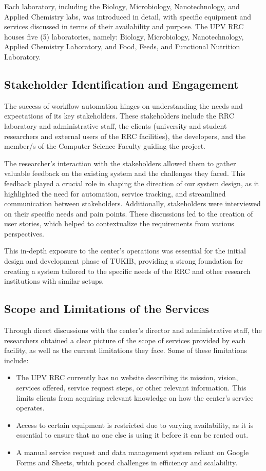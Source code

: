 Each laboratory, including the Biology, Microbiology, Nanotechnology, and Applied Chemistry labs, was introduced in detail, with specific equipment and services discussed in terms of their availability and purpose. The UPV RRC houses five (5) laboratories, namely: Biology, Microbiology, Nanotechnology, Applied Chemistry Laboratory, and Food, Feeds, and Functional Nutrition Laboratory.

\subsection{Stakeholder Identification and Engagement}
The success of workflow automation hinges on understanding the needs and expectations of its key stakeholders. These stakeholders include the RRC laboratory and administrative staff, the clients (university and student researchers and external users of the RRC facilities), the developers, and the member/s of the Computer Science Faculty guiding the project.

The researcher's interaction with the stakeholders allowed them to gather valuable feedback on the existing system and the challenges they faced. This feedback played a crucial role in shaping the direction of our system design, as it highlighted the need for automation, service tracking, and streamlined communication between stakeholders. Additionally, stakeholders were interviewed on their specific needs and pain points. These discussions led to the creation of user stories, which helped to contextualize the requirements from various perspectives. 

This in-depth exposure to the center’s operations was essential for the initial design and development phase of TUKIB, providing a strong foundation for creating a system tailored to the specific needs of the RRC and other research institutions with similar setups.

\subsection{Scope and Limitations of the Services}
Through direct discussions with the center’s director and administrative staff, the researchers obtained a clear picture of the scope of services provided by each facility, as well as the current limitations they face. Some of these limitations include:

\begin{itemize}
	\item The UPV RRC currently has no website describing its mission, vision, services offered, service request steps, or other relevant information. This limits clients from acquiring relevant knowledge on how the center's service operates.
	\item Access to certain equipment is restricted due to varying availability, as it is essential to ensure that no one else is using it before it can be rented out.
	\item A manual service request and data management system reliant on Google Forms and Sheets, which posed challenges in efficiency and scalability.
\end{itemize}

